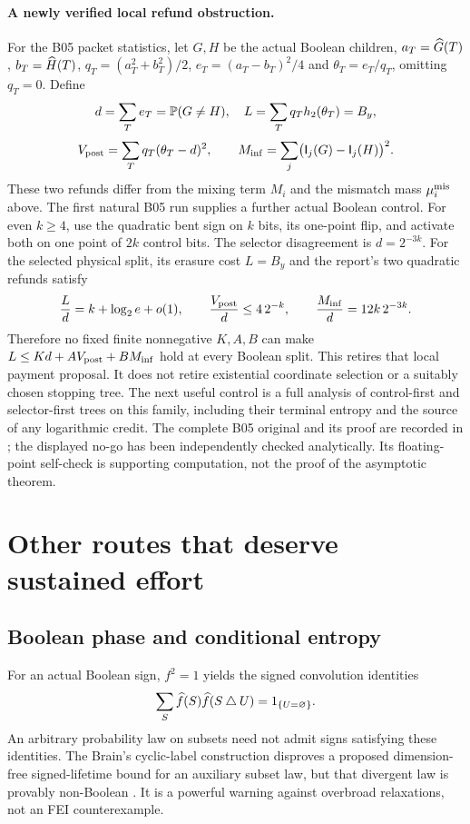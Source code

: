 \documentclass[11pt]{article}
\begin{document}
\paragraph{A newly verified local refund obstruction.}
\label{par:b05-refund}
For the B05 packet statistics, let $G,H$ be the actual Boolean
children, $a_T=\widehat{G}(T)$, $b_T=\widehat{H}(T)$,
$q_T=(a_T^2+b_T^2)/2$, $e_T=(a_T-b_T)^2/4$ and
$\theta_T=e_T/q_T$, omitting $q_T=0$. Define
\[
 d=\sum_T e_T=\mathbb P(G\ne H),\quad
 L=\sum_T q_T h_2(\theta_T)=B_y,
\]
\[
 V_{\rm post}=\sum_Tq_T(\theta_T-d)^2,\qquad
 M_{\rm inf}=\sum_j\bigl(\mathsf I_j(G)-\mathsf I_j(H)\bigr)^2.
\]
These two refunds differ from the mixing term $M_i$ and the
mismatch mass $\mu_i^{\rm mis}$ above.
The first natural B05 run supplies a further actual Boolean
control. For even $k\ge4$, use the quadratic bent sign on $k$
bits, its one-point flip, and activate both on one point of
$2k$ control bits. The selector disagreement is $d=2^{-3k}$.
For the selected physical split, its erasure cost $L=B_y$ and
the report's two quadratic refunds satisfy
\[
 \frac{L}{d}=k+\log_2e+o(1),\qquad
 \frac{V_{\rm post}}d\le4\,2^{-k},\qquad
 \frac{M_{\rm inf}}d=12k\,2^{-3k}.
\]
Therefore no fixed finite nonnegative $K,A,B$ can make
$L\le Kd+A V_{\rm post}+B M_{\rm inf}$ hold at every Boolean
split. This retires that local payment proposal. It does not
retire existential coordinate selection or a suitably chosen
stopping tree. The next useful control is a full analysis of
control-first and selector-first trees on this family, including
their terminal entropy and the source of any logarithmic credit.
The complete B05 original and its proof are recorded in
\cite{B05Rare}; the displayed no-go has been independently
checked analytically. Its floating-point self-check is
supporting computation, not the proof of the asymptotic theorem.

\section{Other routes that deserve sustained effort}

\subsection{Boolean phase and conditional entropy}

For an actual Boolean sign, $f^2=1$ yields the signed convolution identities
\[
 \sum_S\widehat{f}(S)\widehat{f}(S\mathbin\triangle U)=1_{\{U=\varnothing\}}.
\]
An arbitrary probability law on subsets need not admit signs satisfying these identities. The Brain's cyclic-label construction disproves a proposed dimension-free signed-lifetime bound for an auxiliary subset law, but that divergent law is provably non-Boolean \cite{Brain51}. It is a powerful warning against overbroad relaxations, not an FEI counterexample.
\end{document}
